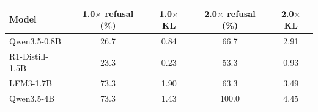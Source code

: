\begin{tabular}{lcccc}
\toprule
Model & 1.0$\times$ refusal (\%) & 1.0$\times$ KL & 2.0$\times$ refusal (\%) & 2.0$\times$ KL \\
\midrule
Qwen3.5-0.8B & 26.7 & 0.84 & 66.7 & 2.91 \\
R1-Distill-1.5B & 23.3 & 0.23 & 53.3 & 0.93 \\
LFM3-1.7B & 73.3 & 1.90 & 63.3 & 3.49 \\
Qwen3.5-4B & 73.3 & 1.43 & 100.0 & 4.45 \\
\bottomrule
\end{tabular}